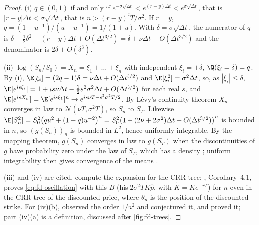 \begin{proof}
(i) $q\in(0,1)$ if and only if $e^{-\sigma\sqrt{\Delta t}}<e^{(r-y)\Delta t}<e^{\sigma\sqrt{\Delta t}}$, that is
$|r-y|\Delta t<\sigma\sqrt{\Delta t}$, that is $n>(r-y)^2T/\sigma^2$. If $r=y$,
$q=(1-u^{-1})/(u-u^{-1})=1/(1+u)$. With $\delta=\sigma\sqrt{\Delta t}$, the numerator of $q$ is
$\delta-\frac12\delta^2+(r-y)\Delta t+O(\Delta t^{3/2})=\delta+\nu\Delta t+O(\Delta t^{3/2})$ and the denominator is
$2\delta+O(\delta^3)$.

(ii) $\log(S_n/S_0)=X_n=\xi_1+\dots+\xi_n$ with independent $\xi_i=\pm\delta$, $\Q(\xi_i=\delta)=q$. By (i),
$\E[\xi_i]=(2q-1)\delta=\nu\Delta t+O(\Delta t^{3/2})$ and $\E[\xi_i^2]=\sigma^2\Delta t$, so, as $|\xi_i|\le\delta$,
$\E[e^{is\xi_i}]=1+is\nu\Delta t-\frac12s^2\sigma^2\Delta t+O(\Delta t^{3/2})$ for each real $s$, and
$\E[e^{isX_n}]=\E[e^{is\xi_1}]^n\to e^{is\nu T-s^2\sigma^2T/2}$. By Lévy's continuity theorem $X_n$ converges in
law to $\mathcal N(\nu T,\sigma^2T)$, so $S_n$ to $S_T$. Likewise
$\E[S_n^2]=S_0^2\big(qu^2+(1-q)u^{-2}\big)^n=S_0^2\big(1+(2\nu+2\sigma^2)\Delta t+O(\Delta t^{3/2})\big)^n$ is
bounded in $n$, so $(g(S_n))_n$ is bounded in $L^2$, hence uniformly integrable. By the mapping
theorem, $g(S_n)$ converges in law to $g(S_T)$ when the discontinuities of $g$ have probability zero
under the law of $S_T$, which has a density \citep[Theorem~2.7]{billingsley}; uniform
integrability then gives convergence of the means \citep[Theorem~3.5]{billingsley}.

(iii) and (iv) are cited. \textcite{diener-diener-2004} compute the expansion for the CRR tree;
\textcite{walsh-2003}, Corollary~4.1, proves \eqref{eq:fd-oscillation} with this $B$ (his
$2\sigma^2T\tilde K\hat p$, with $\tilde K=Ke^{-rT}$) for $n$ even in the CRR tree of the discounted price, where $\theta_n$
is the position of the discounted strike. For (iv)(b),
\textcite{leisen-reimer-1996} observed the order $1/n^2$ and conjectured it, and
\textcite{joshi-2010} proved it; part (iv)(a) is a definition, discussed after
\cref{fig:fd-trees}.
\end{proof}

